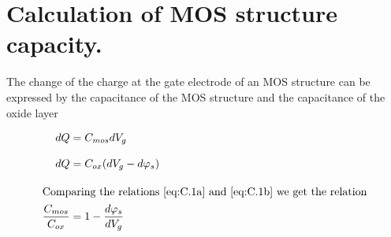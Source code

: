 
\chapter{Calculation of MOS structure capacity.}\label{app:AppendixC}

The change of the charge at the gate electrode of an MOS structure can
be expressed by the capacitance of the MOS structure and the
capacitance of the oxide layer

\begin{subequations}\label{eq:C.1}
  \begin{align}
    dQ &= C_{mos} dV_g                                    \label{eq:C.1a}\\[0.3cm]
    dQ &= C_{ox} (dV_g - d\varphi_s)                      \label{eq:C.1b}\\[0.3cm]
    \intertext{Comparing the relations~\ref{eq:C.1a} and~\ref{eq:C.1b} we get the relation}
    \frac{C_{mos}}{C_{ox}} &= 1 - \frac{d\varphi_s}{dV_g} \label{eq:C.1c}
  \end{align}
\end{subequations}
